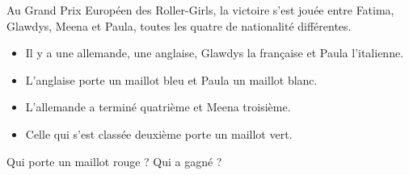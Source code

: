 
\begin{exercice}\label{exosmath-0764}

Au Grand Prix Européen des Roller-Girls, la victoire s'est jouée entre Fatima, Glawdys, Meena et Paula, toutes les quatre de nationalité différentes.
\begin{itemize}
    \item 
 Il y a une allemande, une anglaise, Glawdys la française et Paula l'italienne.
 \item
 L'anglaise porte un maillot bleu et Paula un maillot blanc.
 \item
 L'allemande a terminé quatrième et Meena troisième.
 \item
 Celle qui s'est classée deuxième porte un maillot vert.
\end{itemize}
Qui porte un maillot rouge ? Qui a gagné ?

\end{exercice}
